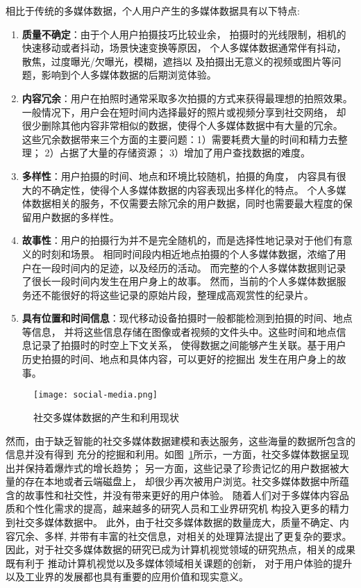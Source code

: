 相比于传统的多媒体数据，个人用户产生的多媒体数据具有以下特点:
\begin{enumerate}
    \item \textbf{质量不确定}：由于个人用户拍摄技巧比较业余，
        拍摄时的光线限制，相机的快速移动或者抖动，场景快速变换等原因，
        个人多媒体数据通常伴有抖动，散焦，过度曝光/欠曝光，模糊，遮挡以
        及拍摄出无意义的视频或图片等问题，影响到个人多媒体数据的后期浏览体验。

    \item \textbf{内容冗余}：用户在拍照时通常采取多次拍摄的方式来获得最理想的拍照效果。
        一般情况下，用户会在短时间内选择最好的照片或视频分享到社交网络，
        却很少删除其他内容非常相似的数据，使得个人多媒体数据中有大量的冗余。
        这些冗余数据带来三个方面的主要问题：1）需要耗费大量的时间和精力去整理；
        2）占据了大量的存储资源； 3）增加了用户查找数据的难度。

    \item \textbf{多样性}：用户拍摄的时间、地点和环境比较随机，拍摄的角度，
        内容具有很大的不确定性，使得个人多媒体数据的内容表现出多样化的特点。
        个人多媒体数据相关的服务，不仅需要去除冗余的用户数据，同时也需要最大程度的保留用户数据的多样性。

    \item \textbf{故事性}：用户的拍摄行为并不是完全随机的，而是选择性地记录对于他们有意义的时刻和场景。
        相同时间段内相近地点拍摄的个人多媒体数据，浓缩了用户在一段时间内的足迹，以及经历的活动。
        而完整的个人多媒体数据则记录了很长一段时间内发生在用户身上的故事。
        然而，当前的个人多媒体数据服务还不能很好的将这些记录的原始片段，整理成高观赏性的纪录片。

    \item \textbf{具有位置和时间信息}：现代移动设备拍摄时一般都能检测到拍摄的时间、地点等信息，
        并将这些信息存储在图像或者视频的文件头中。这些时间和地点信息记录了拍摄时的时空上下文关系，
        使得数据之间能够产生关联。基于用户历史拍摄的时间、地点和具体内容，可以更好的挖掘出
        发生在用户身上的故事。
\end{enumerate}

\begin{figure}[ht]
\centering
\texttt{[image: social-media.png]}
\caption{社交多媒体数据的产生和利用现状} \label{fig:status}
\end{figure}
然而，由于缺乏智能的社交多媒体数据建模和表达服务，这些海量的数据所包含的信息并没有得到
充分的挖掘和利用。如图~\ref{fig:status}所示，一方面，社交多媒体数据呈现出并保持着爆炸式的增长趋势；
另一方面，这些记录了珍贵记忆的用户数据被大量的存在本地或者云端磁盘上，
却很少再次被用户浏览。社交多媒体数据中所蕴含的故事性和社交性，并没有带来更好的用户体验。
随着人们对于多媒体内容品质和个性化需求的提高，越来越多的研究人员和工业界研究机
构投入更多的精力到社交多媒体数据中。
此外，由于社交多媒体数据的数量庞大，质量不确定、内容冗余、多样,
并带有丰富的社交信息，对相关的处理算法提出了更复杂的要求。
因此，对于社交多媒体数据的研究已成为计算机视觉领域的研究热点，相关的成果既有利于
推动计算机视觉以及多媒体领域相关课题的创新，
对于用户体验的提升以及工业界的发展都也具有重要的应用价值和现实意义。

